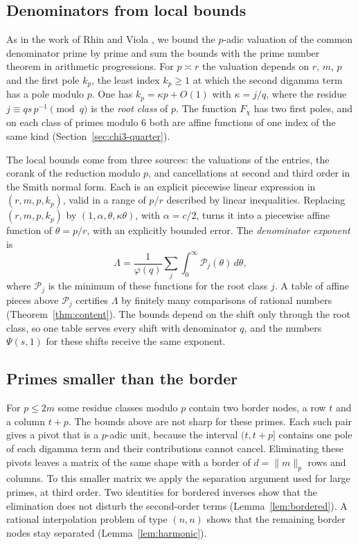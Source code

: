\documentclass[11pt]{amsart}
\theoremstyle{definition}
\theoremstyle{remark}
\numberwithin{equation}{section}
\begin{document}
\subsection{Denominators from local bounds}
As in the work of Rhin and Viola \cite{RhinViola96,RhinViola01}, we bound the $p$-adic valuation of the common
denominator prime by prime and sum the bounds with the prime number theorem in arithmetic progressions. For $p\asymp r$
the valuation depends on $r$, $m$, $p$ and the first pole $k_p$, the least index $k_p\ge1$ at which the second digamma
term has a pole modulo $p$. One has $k_p=\kappa p+O(1)$ with $\kappa=j/q$, where the residue $j\equiv qs\,p^{-1}\pmod q$
is the \emph{root class} of $p$. The function $F_\chi$ has two first poles, and on each class of primes modulo $6$ both
are affine functions of one index of the same kind (Section~\ref{sec:chi3-quarter}).

The local bounds come from three sources: the valuations of the entries, the corank of the reduction modulo $p$, and
cancellations at second and third order in the Smith normal form. Each is an explicit piecewise linear expression in
$(r,m,p,k_p)$, valid in a range of $p/r$ described by linear inequalities. Replacing $(r,m,p,k_p)$ by
$(1,\alpha,\theta,\kappa\theta)$, with $\alpha=c/2$, turns it into a piecewise affine function of $\theta=p/r$, with an
explicitly bounded error. The \emph{denominator exponent} is
\[
 \Lambda=\frac1{\varphi(q)}\sum_j\int_0^\infty\mathcal P_j(\theta)\,d\theta,
\]
where $\mathcal P_j$ is the minimum of these functions for the root class $j$. A table of affine pieces above
$\mathcal P_j$ certifies $\Lambda$ by finitely many comparisons of rational numbers (Theorem~\ref{thm:content}). The
bounds depend on the shift only through the root class, so one table serves every shift with denominator $q$, and the
numbers $\Psi(s,1)$ for these shifts receive the same exponent.

\subsection{Primes smaller than the border}
For $p\le2m$ some residue classes modulo $p$ contain two border nodes, a row $t$ and a column $t+p$. The bounds above
are not sharp for these primes. Each such pair gives a pivot that is a $p$-adic unit, because the interval $(t,t+p]$
contains one pole of each digamma term and their contributions cannot cancel. Eliminating these pivots leaves a matrix
of the same shape with a border of $d=\|m\|_p$ rows and columns. To this smaller matrix we apply the separation
argument used for large primes, at third order. Two identities for bordered inverses show that the elimination does not
disturb the second-order terms (Lemma~\ref{lem:bordered}). A rational interpolation problem of type $(n,n)$ shows that
the remaining border nodes stay separated (Lemma~\ref{lem:harmonic}).
\end{document}
